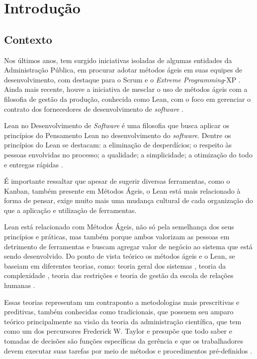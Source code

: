 
\chapter[Introdução]{Introdução}



\section[Contexto]{Contexto}

Nos últimos anos, tem surgido iniciativas isoladas de algumas entidades da Administração Pública, em procurar adotar métodos ágeis em suas equipes de desenvolvimento, com destaque para o Scrum e o \textit{Extreme Programming}-XP \cite{TCU:2013} \cite{RTMAC}.  Ainda mais recente, houve a iniciativa de mesclar o uso de métodos ágeis com a filosofia de gestão da produção, conhecida como Lean, com o foco em gerenciar o contrato dos fornecedores de desenvolvimento de \textit{software} \cite{agilebrazil}. 

Lean no Desenvolvimento de \textit{Software} é uma filosofia que busca aplicar os princípios do Pensamento Lean no desenvolvimento do \textit{software}. Dentre os princípios do Lean se destacam: a eliminação de desperdícios; o respeito às pessoas envolvidas no processo; a qualidade; a simplicidade; a otimização do todo e entregas rápidas \cite{poppendieck}.

É importante ressaltar que apesar de sugerir diversas ferramentas, como o Kanban, também presente em Métodos Ágeis, o Lean está mais relacionado à forma de pensar, exige muito mais uma mudança cultural de cada organização do que a aplicação e utilização de ferramentas. 

Lean está relacionado com Métodos Ágeis, não só pela semelhança dos seus princípios e práticas, mas também porque ambos valorizam as pessoas em detrimento de ferramentas e buscam agregar valor de negócio ao sistema que está sendo desenvolvido. Do ponto de vista teórico os métodos ágeis e o Lean, se baseiam em diferentes teorias, como: teoria geral dos sistemas \cite{sistemas}, teoria da complexidade \cite{complexidade}, teoria das restrições \cite{katayama2010} e teoria de gestão da escola de relações humanas \cite{administracao}. 

Essas teorias representam um contraponto a metodologias mais prescritivas e preditivas, também conhecidas como tradicionais, que possuem seu amparo teórico principalmente na visão da teoria da administração científica, que tem como um dos percursores Frederick W. Taylor e presupõe que todo saber e tomadas de decisões são funções específicas da gerência e que os trabalhadores devem executar suas tarefas por meio de métodos e procedimentos pré-definidos \cite{administracao}.

